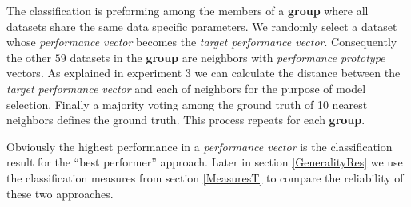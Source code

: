 The classification is preforming among the members of a \textbf{group} where all datasets share the same data specific parameters. We randomly select a dataset whose \textit{performance vector} becomes the \textit{target performance vector}. Consequently the other $59$ datasets in the \textbf{group} are neighbors with \textit{performance prototype} vectors. As explained in experiment 3 we can calculate the distance between the \textit{target performance vector} and each of neighbors for the purpose of model selection. Finally a majority voting among the ground truth of 10 nearest neighbors defines the ground truth. This process repeats for each \textbf{group}.

Obviously the highest performance in a \textit{performance vector} is the classification result for the ``best performer'' approach. Later in section \ref{GeneralityRes} we use the classification measures from section \ref{MeasuresT} to compare the reliability of these two approaches.
